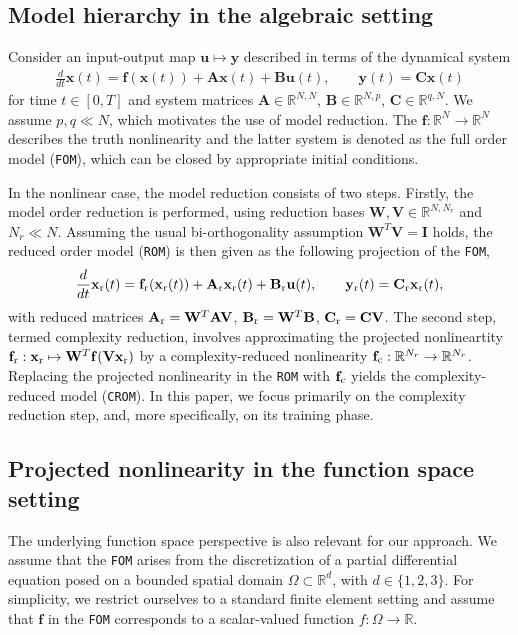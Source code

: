 \documentclass[onefignum,onetabnum]{siamart251104}
\newcommand{\bv}[1]{{\mathbf #1}}
\newcommand{\bt}[1]{{\mathbf{#1}}}
\newcommand{\fom}[1]{{{#1}}} %
\newcommand{\com}[1]{{{#1}_{\rm{c}}}} %
\newcommand{\rom}[1]{{{#1}_{\rm{r}}}}
\newcommand{\Nr}{{N_r}}
\newcommand{\R}{\mathbb{R}}
\newcommand{\ffun}{{\bv{f}}}
\newcommand{\acro}[1]{{\texttt{#1}}}  %
\begin{document}
\subsection{Model hierarchy  in the algebraic setting}\label{subsec:intro-hierarchy}

Consider an input-output map $\bv{u} \mapsto \fom{\bv{y}}$ described in terms of the dynamical system
\begin{align*}
\frac{d}{dt} \fom{\bv{x}}(t) =  \ffun(\fom{\bv{x}}(t)) + \bt{A} \bv{x}(t) + \fom{\bt{B}} \bv{u}(t) , \qquad \fom{\bv{y}}(t) = \fom{\bt{C}} \fom{\bv{x}}(t)
\end{align*}
for time $t \in [0,T]$ and system matrices $\bt{A}\in \R^{N,N}$, $\fom{\bt{B}}\in \R^{N,p}$, $\fom{\bt{C}}\in \R^{q,N}$. We assume  $p,q \ll N$, which motivates the use of model reduction. The $\ffun: \R^N \to \R^N$ describes the truth nonlinearity and the latter system is denoted as the full order model (\acro{FOM}), which can be closed by appropriate initial conditions.


In the nonlinear case, the model reduction consists of two steps. Firstly, the model order reduction is performed, using reduction bases $\bt W, \bt V \in \R^{N,\Nr}$ and $\Nr \ll N$. Assuming the usual bi-orthogonality assumption $\bt{W}^T\bt{V}= \bt{I}$ holds, the reduced order model (\acro{ROM}) is then given as the following projection of the \acro{FOM},
\begin{align*}
\frac{d}{dt} \rom{\bv{x}}(t) =   \rom{\ffun}(\rom{\bv{x}}(t)) + \rom{\bt{A}} \rom{\bv{x}}(t) + \rom{\bt{B}} \bv{u}(t) , \qquad \rom{\bv{y}}(t) = \rom{\bt{C}} \rom{\bv{x}}(t),
\end{align*}
with reduced matrices $\rom{\bt{A}}= \bt{W}^T\bt{A} \bt{V}$,  $\rom{\bt{B}} = \bt{W}^T\bt{B}$, $\rom{\bt{C}} = \bt{C} \bt{V}$.
The second step, termed complexity reduction, involves approximating the projected nonlineartity $\rom{\ffun}: \rom{\bv{x}} \mapsto \bt W^T \ffun(\bt V \rom{\bv{x}})$ by a complexity-reduced nonlinearity $\com{\ffun}: \R^\Nr \to \R^\Nr$. Replacing the projected nonlinearity in the \acro{ROM} with $\com{\ffun}$ yields the complexity-reduced model (\acro{CROM}). In this paper, we focus primarily on the complexity reduction step, and, more specifically, on its training phase.



\subsection{Projected nonlinearity in the function space setting}\label{subsec:intro-nonlinearity}
The underlying function space perspective is also relevant for our approach. We assume that the \acro{FOM} arises from the discretization of a partial differential equation posed on a bounded spatial domain $\Omega \subset \R^d$, with $d \in \{1,2,3\}$. For simplicity, we restrict ourselves to a standard finite element setting and assume that $\ffun$ in the \acro{FOM} corresponds to a scalar-valued function $f: \Omega \to \R$.
\end{document}

